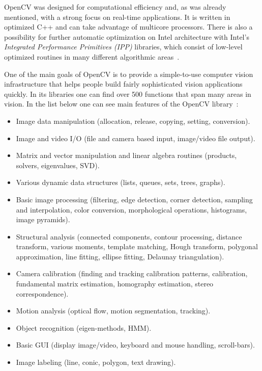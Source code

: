 OpenCV was designed for computational efficiency and, as was already mentioned, with a strong focus on real-time applications. It is written in optimized C++ and can take advantage of multicore processors. There is also a possibility for further automatic optimization on Intel architecture with Intel's \textit{Integrated Performance Primitives (IPP)} libraries, which consist of low-level optimized routines in many different algorithmic areas~\cite{kaehler2016learning}.

One of the main goals of OpenCV is to provide a simple-to-use computer vision infrastructure that helps people build fairly sophisticated vision applications quickly. In its libraries one can find over 500 functions that span many areas in vision. In the list below one can see main features of the OpenCV library~\cite{Illinois_openCV}:
\begin{itemize}
\setlength\itemsep{-0.5em}
\item Image data manipulation (allocation, release, copying, setting, conversion).
\item Image and video I/O (file and camera based input, image/video file output).
\item Matrix and vector manipulation and linear algebra routines (products, solvers, eigenvalues, SVD).
\item Various dynamic data structures (lists, queues, sets, trees, graphs).
\item Basic image processing (filtering, edge detection, corner detection, sampling and interpolation, color conversion, morphological operations, histograms, image pyramids).
\item Structural analysis (connected components, contour processing, distance transform, various moments, template matching, Hough transform, polygonal approximation, line fitting, ellipse fitting, Delaunay triangulation).
\item Camera calibration (finding and tracking calibration patterns, calibration, fundamental matrix estimation, homography estimation, stereo correspondence).
\item Motion analysis (optical flow, motion segmentation, tracking).
\item Object recognition (eigen-methods, HMM).
\item Basic GUI (display image/video, keyboard and mouse handling, scroll-bars).
\item Image labeling (line, conic, polygon, text drawing).
\end{itemize}


